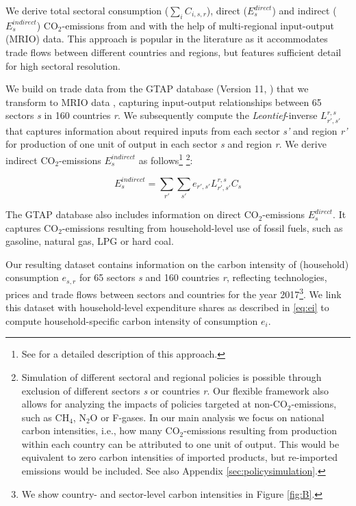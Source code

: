 \documentclass[12pt, a4paper]{article}
\begin{document}
We derive total sectoral consumption ($\sum_{i} C_{i,s,r}$), direct ($E_{s}^{direct}$) and indirect ($E_{s}^{indirect}$) CO$_{2}$-emissions from and with the help of multi-regional input-output (MRIO) data. This approach is popular in the literature as it accommodates trade flows between different countries and regions, but features sufficient detail for high sectoral resolution. 

We build on trade data from the GTAP database (Version 11,  \textcite{Aguiar.2022}) that we transform to MRIO data \autocite{Peters.2011}, capturing input-output relationships between 65 sectors \textit{s} in 160 countries \textit{r}. We subsequently compute the \textit{Leontief}-inverse $L_{r',s'}^{r,s}$ that captures information about required inputs from each sector \textit{s'} and region \textit{r'} for production of one unit of output in each sector \textit{s} and region \textit{r}. We derive indirect CO$_{2}$-emissions $E_{s}^{indirect}$ as follows\footnote{See \textcite{Missbach.2024, Steckel.2021b,Feindt.2021,VogtSchilb.2019} for a detailed description of this approach.} \footnote{Simulation of different sectoral and regional policies is possible through exclusion of different sectors \textit{s} or countries \textit{r}. Our flexible framework also allows for analyzing the impacts of policies targeted at non-CO$_{2}$-emissions, such as CH$_{4}$, N$_{2}$O or F-gases. In our main analysis we focus on national carbon intensities, i.e., how many CO$_{2}$-emissions resulting from production within each country can be attributed to one unit of output. This would be equivalent to zero carbon intensities of imported products, but re-imported emissions would be included. See also Appendix \ref{sec:policysimulation}.}:

\begin{equation}
    E_{s}^{indirect} = \sum_{r'} \sum_{s'} e_{r',s'} L_{r',s'}^{r,s} C_{s}
\end{equation}

The GTAP database also includes information on direct CO$_{2}$-emissions $E_{s}^{direct}$. It captures CO$_{2}$-emissions resulting from household-level use of fossil fuels, such as gasoline, natural gas, LPG or hard coal.

Our resulting dataset contains information on the carbon intensity of (household) consumption $e_{s,r}$ for 65 sectors \textit{s} and 160 countries \textit{r}, reflecting technologies, prices and trade flows between sectors and countries for the year 2017\footnote{We show country- and sector-level carbon intensities in Figure \ref{fig:B}.}. We link this dataset with household-level expenditure shares as described in \ref{eq:ei} to compute household-specific carbon intensity of consumption $e_{i}$.
\end{document}
